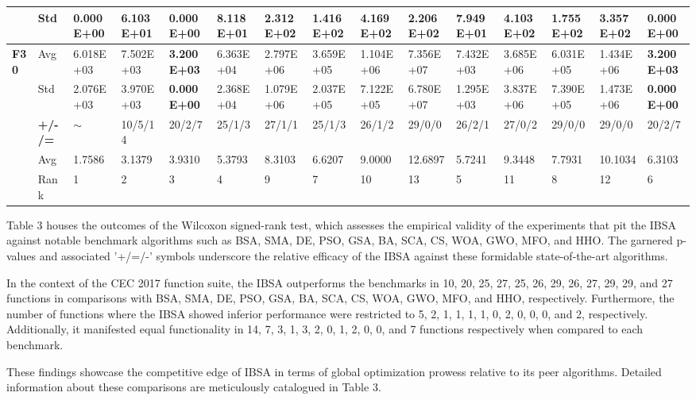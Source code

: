 \documentclass{article} %
\begin{document}
\begin{tabular}{|p{0.2in}|p{0.2in}|p{0.4in}|p{0.4in}|p{0.4in}|p{0.4in}|p{0.4in}|p{0.4in}|p{0.4in}|p{0.4in}|p{0.4in}|p{0.4in}|p{0.4in}|p{0.4in}|p{0.4in}|}
\textbf{} & Std & \textbf{0.000E+00} & 6.103E+01 & \textbf{0.000E+00} & 8.118E+01 & 2.312E+02 & 1.416E+02 & 4.169E+02 & 2.206E+02 & 7.949E+01 & 4.103E+02 & 1.755E+02 & 3.357E+02 & \textbf{0.000E+00} \\ \hline 
\textbf{F30} & Avg & 6.018E+03 & 7.502E+03 & \textbf{3.200E+03} & 6.363E+04 & 2.797E+06 & 3.659E+05 & 1.104E+06 & 7.356E+07 & 7.432E+03 & 3.685E+06 & 6.031E+05 & 1.434E+06 & \textbf{3.200E+03} \\ \hline 
\textbf{} & Std & 2.076E+03 & 3.970E+03 & \textbf{0.000E+00} & 2.368E+04 & 1.079E+06 & 2.037E+05 & 7.122E+05 & 6.780E+07 & 1.295E+03 & 3.837E+06 & 7.390E+05 & 1.473E+06 & \textbf{0.000E+00} \\ \hline 
\textbf{} & \textbf{+/-/=} & $\mathrm{\sim}$ & 10/5/14 & 20/2/7 & 25/1/3 & 27/1/1 & 25/1/3 & 26/1/2 & 29/0/0 & 26/2/1 & 27/0/2 & 29/0/0 & 29/0/0 & 20/2/7 \\ \hline 
\textbf{} & Avg & 1.7586  & 3.1379  & 3.9310  & 5.3793  & 8.3103  & 6.6207  & 9.0000  & 12.6897  & 5.7241  & 9.3448  & 7.7931  & 10.1034  & 6.3103  \\ \hline 
\textbf{} & Rank & 1 & 2 & 3 & 4 & 9 & 7 & 10 & 13 & 5 & 11 & 8 & 12 & 6 \\ \hline 
\end{tabular}



Table 3 houses the outcomes of the Wilcoxon signed-rank test, which assesses the empirical validity of the experiments that pit the IBSA against notable benchmark algorithms such as BSA, SMA, DE, PSO, GSA, BA, SCA, CS, WOA, GWO, MFO, and HHO. The garnered p-values and associated '+/=/-' symbols underscore the relative efficacy of the IBSA against these formidable state-of-the-art algorithms.

In the context of the CEC 2017 function suite, the IBSA outperforms the benchmarks in 10, 20, 25, 27, 25, 26, 29, 26, 27, 29, 29, and 27 functions in comparisons with BSA, SMA, DE, PSO, GSA, BA, SCA, CS, WOA, GWO, MFO, and HHO, respectively. Furthermore, the number of functions where the IBSA showed inferior performance were restricted to 5, 2, 1, 1, 1, 1, 0, 2, 0, 0, 0, and 2, respectively. Additionally, it manifested equal functionality in 14, 7, 3, 1, 3, 2, 0, 1, 2, 0, 0, and 7 functions respectively when compared to each benchmark.

These findings showcase the competitive edge of IBSA in terms of global optimization prowess relative to its peer algorithms. Detailed information about these comparisons are meticulously catalogued in Table 3.
\end{document}
